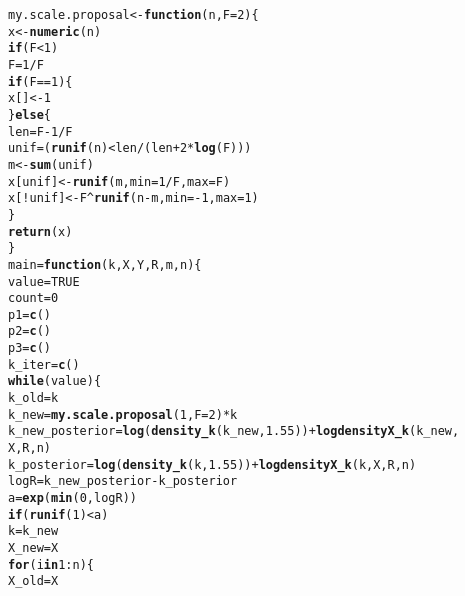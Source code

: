 \documentclass[12pt]{article}\usepackage[]{graphicx}\usepackage[]{color}
\makeatletter
\newcommand{\hlnum}[1]{\textcolor[rgb]{0.686,0.059,0.569}{#1}}%
\newcommand{\hlopt}[1]{\textcolor[rgb]{0,0,0}{#1}}%
\newcommand{\hlstd}[1]{\textcolor[rgb]{0.345,0.345,0.345}{#1}}%
\newcommand{\hlkwa}[1]{\textcolor[rgb]{0.161,0.373,0.58}{\textbf{#1}}}%
\newcommand{\hlkwb}[1]{\textcolor[rgb]{0.69,0.353,0.396}{#1}}%
\newcommand{\hlkwc}[1]{\textcolor[rgb]{0.333,0.667,0.333}{#1}}%
\newcommand{\hlkwd}[1]{\textcolor[rgb]{0.737,0.353,0.396}{\textbf{#1}}}%
\newenvironment{kframe}{%
 \def\at@end@of@kframe{}%
 \ifinner\ifhmode%
  \def\at@end@of@kframe{\end{minipage}}%
  \begin{minipage}{\columnwidth}%
 \fi\fi%
 \def\FrameCommand##1{\hskip\@totalleftmargin \hskip-\fboxsep
 \colorbox{shadecolor}{##1}\hskip-\fboxsep
     \hskip-\linewidth \hskip-\@totalleftmargin \hskip\columnwidth}%
 \MakeFramed {\advance\hsize-\width
   \@totalleftmargin\z@ \linewidth\hsize
   \@setminipage}}%
 {\par\unskip\endMakeFramed%
 \at@end@of@kframe}
\newenvironment{knitrout}{}{} %
\makeatother
\begin{document}
\begin{knitrout}
\begin{kframe}
\begin{alltt}
\hlstd{my.scale.proposal} \hlkwb{<-} \hlkwa{function}\hlstd{(}\hlkwc{n}\hlstd{,} \hlkwc{F} \hlstd{=} \hlnum{2}\hlstd{) \{}
    \hlstd{x} \hlkwb{<-} \hlkwd{numeric}\hlstd{(n)}
    \hlkwa{if} \hlstd{(F} \hlopt{<} \hlnum{1}\hlstd{)}
        \hlstd{F} \hlkwb{=} \hlnum{1}\hlopt{/}\hlstd{F}
    \hlkwa{if} \hlstd{(F} \hlopt{==} \hlnum{1}\hlstd{) \{}
        \hlstd{x[]} \hlkwb{<-} \hlnum{1}
    \hlstd{\}} \hlkwa{else} \hlstd{\{}
        \hlstd{len} \hlkwb{=} \hlstd{F} \hlopt{-} \hlnum{1}\hlopt{/}\hlstd{F}
        \hlstd{unif} \hlkwb{=} \hlstd{(}\hlkwd{runif}\hlstd{(n)} \hlopt{<} \hlstd{len}\hlopt{/}\hlstd{(len} \hlopt{+} \hlnum{2} \hlopt{*} \hlkwd{log}\hlstd{(F)))}
        \hlstd{m} \hlkwb{<-} \hlkwd{sum}\hlstd{(unif)}
        \hlstd{x[unif]} \hlkwb{<-} \hlkwd{runif}\hlstd{(m,} \hlkwc{min} \hlstd{=} \hlnum{1}\hlopt{/}\hlstd{F,} \hlkwc{max} \hlstd{= F)}
        \hlstd{x[}\hlopt{!}\hlstd{unif]} \hlkwb{<-} \hlstd{F}\hlopt{^}\hlkwd{runif}\hlstd{(n} \hlopt{-} \hlstd{m,} \hlkwc{min} \hlstd{=} \hlopt{-}\hlnum{1}\hlstd{,} \hlkwc{max} \hlstd{=} \hlnum{1}\hlstd{)}
    \hlstd{\}}
    \hlkwd{return}\hlstd{(x)}
\hlstd{\}}
\hlstd{main} \hlkwb{=} \hlkwa{function}\hlstd{(}\hlkwc{k}\hlstd{,} \hlkwc{X}\hlstd{,} \hlkwc{Y}\hlstd{,} \hlkwc{R}\hlstd{,} \hlkwc{m}\hlstd{,} \hlkwc{n}\hlstd{) \{}
    \hlstd{value} \hlkwb{=} \hlnum{TRUE}
    \hlstd{count} \hlkwb{=} \hlnum{0}
    \hlstd{p1} \hlkwb{=} \hlkwd{c}\hlstd{()}
    \hlstd{p2} \hlkwb{=} \hlkwd{c}\hlstd{()}
    \hlstd{p3} \hlkwb{=} \hlkwd{c}\hlstd{()}
    \hlstd{k_iter} \hlkwb{=} \hlkwd{c}\hlstd{()}
    \hlkwa{while} \hlstd{(value) \{}
        \hlstd{k_old} \hlkwb{=} \hlstd{k}
        \hlstd{k_new} \hlkwb{=} \hlkwd{my.scale.proposal}\hlstd{(}\hlnum{1}\hlstd{,} \hlkwc{F} \hlstd{=} \hlnum{2}\hlstd{)} \hlopt{*} \hlstd{k}
        \hlstd{k_new_posterior} \hlkwb{=} \hlkwd{log}\hlstd{(}\hlkwd{density_k}\hlstd{(k_new,} \hlnum{1.55}\hlstd{))} \hlopt{+} \hlkwd{logdensityX_k}\hlstd{(k_new,}
            \hlstd{X, R, n)}
        \hlstd{k_posterior} \hlkwb{=} \hlkwd{log}\hlstd{(}\hlkwd{density_k}\hlstd{(k,} \hlnum{1.55}\hlstd{))} \hlopt{+} \hlkwd{logdensityX_k}\hlstd{(k, X, R, n)}
        \hlstd{logR} \hlkwb{=} \hlstd{k_new_posterior} \hlopt{-} \hlstd{k_posterior}
        \hlstd{a} \hlkwb{=} \hlkwd{exp}\hlstd{(}\hlkwd{min}\hlstd{(}\hlnum{0}\hlstd{, logR))}
        \hlkwa{if} \hlstd{(}\hlkwd{runif}\hlstd{(}\hlnum{1}\hlstd{)} \hlopt{<} \hlstd{a)}
            \hlstd{k} \hlkwb{=} \hlstd{k_new}
        \hlstd{X_new} \hlkwb{=} \hlstd{X}
        \hlkwa{for} \hlstd{(i} \hlkwa{in} \hlnum{1}\hlopt{:}\hlstd{n) \{}
            \hlstd{X_old} \hlkwb{=} \hlstd{X}

\end{alltt}
\end{kframe}
\end{knitrout}
\end{document}
